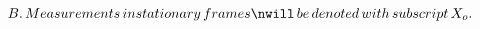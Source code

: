 \documentclass[preview]{standalone}
\begin{document}
\begin{align*}
B.\,Measurements\,in stationary\,frames\nwill\,be\,denoted\,with\,subscript\,X_{o}.
\end{align*}
\end{document}
